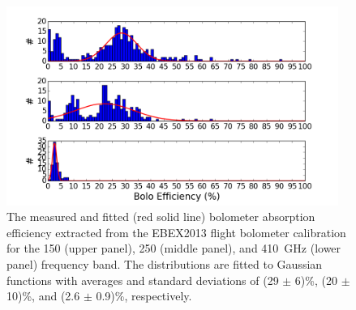 \documentclass[../EBEXPaper2.tex]{subfiles}
\begin{document}
\begin{figure}[htbp]
\centering
\includegraphics[height={6.5cm}]{images/detectors_and_readout/opt_eff_from_calib_dist}%
\caption{The measured and fitted (red solid line) bolometer absorption efficiency extracted from the \ac{EBEX2013} flight bolometer calibration for the 150 (upper panel), 250 (middle panel), and 410~GHz (lower panel) frequency band.
The distributions are fitted to Gaussian functions with averages and standard deviations of (29 $\pm$ 6)\%, (20 $\pm$ 10)\%, and (2.6 $\pm$ 0.9)\%, respectively.%
}
\label{fig:opt_eff_from_calib_dist}
\end{figure}



%
\end{document}
